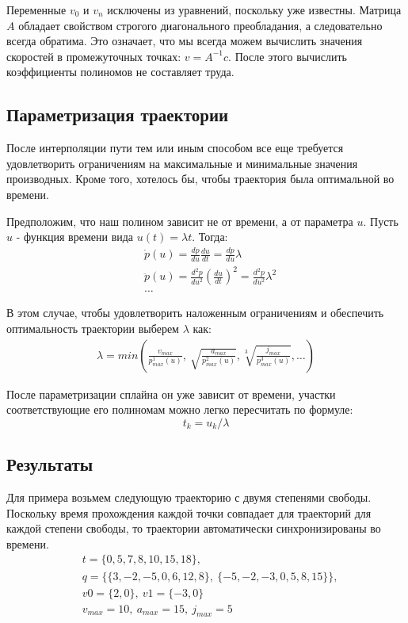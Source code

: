 Переменные $v_{0}$ и $v_{n}$ исключены из уравнений, поскольку уже известны. Матрица $A$ обладает свойством строгого диагонального преобладания\cite{DDMWiki}, а следовательно всегда обратима. Это означает, что мы всегда можем вычислить значения скоростей в промежуточных точках: $v = A^{-1}c$. После этого вычислить коэффициенты полиномов не составляет труда.


\subsection{Параметризация траектории} \label{subsect5_2_2}
После интерполяции пути тем или иным способом все еще требуется удовлетворить ограничениям на максимальные и минимальные значения производных. Кроме того, хотелось бы, чтобы траектория была оптимальной во времени.

Предположим, что наш полином зависит не от времени, а от параметра $u$. Пусть $u$ - функция времени вида $u(t) = \lambda t$. Тогда:
\begin{align*}
	&\dot{p}(u) = \frac{dp}{du}\frac{du}{dt} = \frac{dp}{du}\lambda \\
	&\ddot{p}(u) = \frac{d^{2}p}{du^{2}}(\frac{du}{dt})^{2} = \frac{d^{2}p}{du^{2}}\lambda^{2}\\
	&\dotso
\end{align*}

В этом случае, чтобы удовлетворить наложенным ограничениям и обеспечить оптимальность траектории выберем $\lambda$ как:
\begin{align*}
	\lambda = min(\frac{v_{max}}{p_{max}^{1}(u)},\ \sqrt{\frac{a_{max}}{p_{max}^{2}(u)}}, \sqrt[3]{\frac{j_{max}}{p_{max}^{3}(u)}}, \dots)   
\end{align*}

После параметризации сплайна он уже зависит от времени, участки соответствующие его полиномам можно легко пересчитать по формуле:
\[
	t_{k} = u_{k} / \lambda
\]

\subsection{Результаты} \label{subsect5_2_3}
Для примера возьмем следующую траекторию с двумя степенями свободы. Поскольку время прохождения каждой точки совпадает для траекторий для каждой степени свободы, то траектории автоматически синхронизированы во времени.
\begin{align*}
	&t = \{0, 5, 7, 8, 10, 15, 18\},\\
	&q = \{\{3, -2, -5, 0, 6, 12, 8\},\ \{-5, -2, -3, 0, 5, 8, 15\}\},\\
	&v0 = \{2, 0\},\ v1 = \{-3, 0\}\\
	&v_{max} = 10,\ a_{max} = 15,\ j_{max} = 5
\end{align*}

